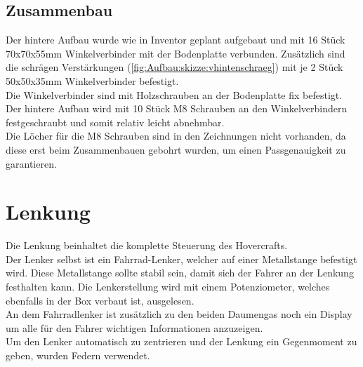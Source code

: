 \begin{landscape}
    \clearpage
    \clearpage
    \clearpage
    
\end{landscape}

\subsection{Zusammenbau}
Der hintere Aufbau wurde wie in Inventor geplant aufgebaut und mit 16 Stück 70x70x55mm Winkelverbinder mit der Bodenplatte verbunden. Zusätzlich sind die schrägen Verstärkungen (\autoref{fig:Aufbau:skizze:vhintenschraeg}) mit je 2 Stück 50x50x35mm Winkelverbinder befestigt.\\
Die Winkelverbinder sind mit Holzschrauben an der Bodenplatte fix befestigt. Der hintere Aufbau wird mit 10 Stück M8 Schrauben an den Winkelverbindern festgeschraubt und somit relativ leicht abnehmbar.\\
Die Löcher für die M8 Schrauben sind in den Zeichnungen nicht vorhanden, da diese erst beim Zusammenbauen gebohrt wurden, um einen Passgenauigkeit zu garantieren.\\

\section{Lenkung}
Die Lenkung beinhaltet die komplette Steuerung des Hovercrafts.\\
Der Lenker selbst ist ein Fahrrad-Lenker, welcher auf einer Metallstange befestigt wird. Diese Metallstange sollte stabil sein, damit sich der Fahrer an der Lenkung festhalten kann. Die Lenkerstellung wird mit einem Potenziometer, welches ebenfalls in der Box verbaut ist, ausgelesen.\\
An dem Fahrradlenker ist zusätzlich zu den beiden Daumengas noch ein Display um alle für den Fahrer wichtigen Informationen anzuzeigen.\\
Um den Lenker automatisch zu zentrieren und der Lenkung ein Gegenmoment zu geben, wurden Federn verwendet.

